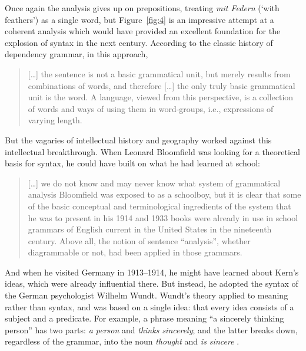 \documentclass[output=paper
	        ,collection
	        ,collectionchapter
 	        ,biblatex
                ,babelshorthands
                ,newtxmath
                ,draftmode
                ,colorlinks, citecolor=brown
]{./langsci/langscibook}
\begin{document}
Once again the analysis gives up on prepositions, treating \emph{mit Federn} (‘with feathers’) as a single word, but Figure~\ref{fig:4} is an impressive attempt at a coherent analysis which would have provided an excellent foundation for the explosion of syntax in the next century. According to the classic history of dependency grammar, in this approach,

\begin{quotation}
	[\dots] the sentence is not a basic grammatical unit, but merely results from combinations of words, and therefore [\dots] the only truly basic grammatical unit is the word. A language, viewed from this perspective, is a collection of words and ways of using them in word-groups, i.e., expressions of varying length. \citep[21]{Percival1976}
\end{quotation}

But the vagaries of intellectual history and geography worked against this intellectual breakthrough. When Leonard Bloomfield was looking for a theoretical basis for syntax, he could have built on what he had learned at school:

\begin{quotation}
	[\dots] we do not know and may never know what system of grammatical analysis Bloomfield was exposed to as a schoolboy, but it is clear that some of the basic conceptual and terminological ingredients of the system that he was to present in his 1914 and 1933 books were already in use in school grammars of English current in the United States in the nineteenth century. Above all, the notion of sentence ``analysis'', whether diagrammable or not, had been applied in those grammars. \citep[18]{Percival1976}
\end{quotation}

And when he visited Germany in 1913--1914, he might have learned about Kern’s ideas, which were already influential there. But instead, he adopted the syntax of the German psychologist Wilhelm Wundt. Wundt’s theory applied to meaning rather than syntax, and was based on a single idea: that every idea consists of a subject and a predicate. For example, a phrase meaning ``a sincerely thinking person'' has two parts: \emph{a person} and \emph{thinks sincerely}; and the latter breaks down, regardless of the grammar, into the noun \emph{thought} and \emph{is sincere} \citep{Percival1976}.
\end{document}
